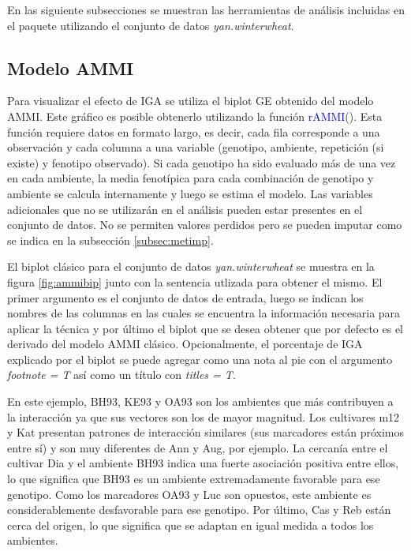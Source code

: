   
En las siguiente subsecciones se muestran las herramientas de análisis incluidas en el paquete utilizando el conjunto de datos \emph{yan.winterwheat}.  
  
\subsection{Modelo AMMI}

Para visualizar el efecto de IGA se utiliza el biplot GE obtenido del modelo AMMI. Este gráfico es posible obtenerlo utilizando la función \textcolor{blue}{rAMMI}(). Esta función requiere datos en formato largo, es decir, cada fila corresponde a una observación y cada columna a una variable (genotipo, ambiente, repetición (si existe) y fenotipo observado). Si cada genotipo ha sido evaluado más de una vez en cada ambiente, la media fenotípica para cada combinación de genotipo y ambiente se calcula internamente y luego se estima el modelo. Las variables adicionales que no se utilizarán en el análisis pueden estar presentes en el conjunto de datos. No se permiten valores perdidos pero se pueden imputar como se indica en la subsección \ref{subsec:metimp}. 

El biplot clásico para el conjunto de datos \emph{yan.winterwheat} se muestra en la figura \ref{fig:ammibip} junto con la sentencia utlizada para obtener el mismo. El primer argumento es el conjunto de datos de entrada, luego se indican los nombres de las columnas en las cuales se encuentra la información necesaria para aplicar la técnica y por último el biplot que se desea obtener que por defecto es el derivado del modelo AMMI clásico. Opcionalmente, el porcentaje de IGA explicado por el biplot se puede agregar como una nota al pie con el argumento \emph{footnote = T} así como un título con \emph{titles = T}. 

En este ejemplo, BH93, KE93 y OA93 son los ambientes que más contribuyen a la interacción ya que sus vectores son los de mayor magnitud. Los cultivares m12 y Kat presentan patrones de interacción similares (sus marcadores están próximos entre sí) y son muy diferentes de Ann y Aug, por ejemplo. La cercanía entre el cultivar Dia y el ambiente BH93 indica una fuerte asociación positiva entre ellos, lo que significa que BH93 es un ambiente extremadamente favorable para ese genotipo. Como los marcadores OA93 y Luc son opuestos, este ambiente es considerablemente desfavorable para ese genotipo. Por último, Cas y Reb están cerca del origen, lo que significa que se adaptan en igual medida a todos los ambientes.

